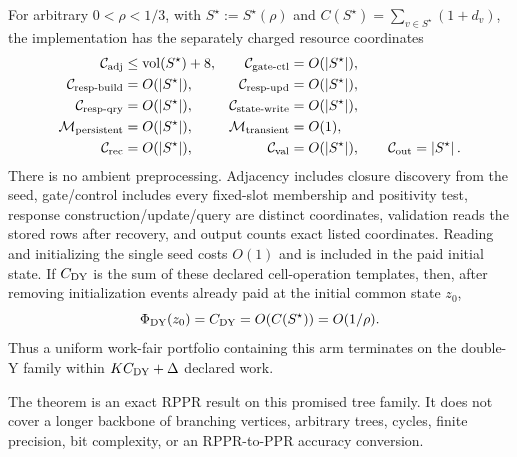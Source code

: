 \begin{theorem}
For arbitrary $0<\rho<1/3$, with $S^\star:=S^\star(\rho)$ and
$C(S^\star)=\sum_{v\in S^\star}(1+d_v)$, the implementation has the separately
charged resource coordinates
\begin{align}
 \mathcal C_{\rm adj}
 &\leq \operatorname{vol}(S^\star)+8,
 &
 \mathcal C_{\rm gate\text{-}ctl}
 &=O(\left\lvert S^\star \right\rvert),
 \notag\\
 \mathcal C_{\rm resp\text{-}build}
 &=O(\left\lvert S^\star \right\rvert),
 &
 \mathcal C_{\rm resp\text{-}upd}
 &=O(\left\lvert S^\star \right\rvert),
 \notag\\
 \mathcal C_{\rm resp\text{-}qry}
 &=O(\left\lvert S^\star \right\rvert),
 &
 \mathcal C_{\rm state\text{-}write}
 &=O(\left\lvert S^\star \right\rvert),
 \label{eq:double-y-resource-ledger}\\
 \mathcal M_{\rm persistent}
 &=O(\left\lvert S^\star \right\rvert),
 &
 \mathcal M_{\rm transient}
 &=O(1),
 \notag\\
 \mathcal C_{\rm rec}
 &=O(\left\lvert S^\star \right\rvert),
 &
 \mathcal C_{\rm val}
 &=O(\left\lvert S^\star \right\rvert),
 \qquad
 \mathcal C_{\rm out}=\left\lvert S^\star \right\rvert.
 \notag
\end{align}
There is no ambient preprocessing.  Adjacency includes closure discovery from
the seed, gate/control includes every fixed-slot membership and positivity
test, response construction/update/query are distinct coordinates, validation
reads the stored rows after recovery, and output counts exact listed
coordinates.  Reading and initializing the single seed costs $O(1)$ and is
included in the paid initial state.  If $C_{\rm DY}$ is the sum of these declared cell-operation
templates, then, after removing initialization events already paid at the
initial common state $z_0$,
\begin{equation}
 \Phi_{\rm DY}(z_0)=C_{\rm DY}
 =O(C(S^\star))=O(1/\rho).
 \label{eq:double-y-token-work}
\end{equation}
Thus a uniform work-fair portfolio containing this arm terminates on the
double-Y family within $K C_{\rm DY}+\Delta$ declared work.

The theorem is an exact RPPR result on this promised tree family.  It does not
cover a longer backbone of branching vertices, arbitrary trees, cycles,
finite precision, bit complexity, or an RPPR-to-PPR accuracy conversion.
\end{theorem}

